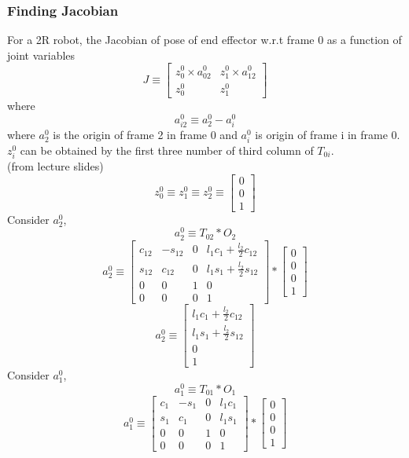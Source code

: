\documentclass[12pt]{article}
\newcommand{\fromlectures}{{\\ \color{blue} \hspace*{\fill}(from lecture slides)} \\}
\begin{document}
\subsubsection*{Finding Jacobian}
For a 2R robot, the Jacobian of pose of end effector w.r.t frame 0 as a function of joint variables
\[
  J \equiv
  \begin{bmatrix} z_0^0 \times a_{02}^0 & z_1^0 \times a_{12}^0\\ z_0^0 & z_1^0 \end{bmatrix}
\]
where
\[
  a_{i2}^{0} \equiv a_{2}^{0} - a_{i}^{0}
\]
where $a_2^0$ is the origin of frame 2 in frame 0 and $a_i^0$ is origin of frame i in frame 0.
$z_i^0$ can be obtained by the first three number of third column of $T_{0i}$.
\fromlectures
\[
  z_0^{0} \equiv z_1^{0} \equiv z_2^{0} \equiv \begin{bmatrix} 0 \\ 0 \\ 1 \end{bmatrix}
\]
Consider $a_{2}^{0}$,
\[
  a_2^0 \equiv T_{02} * O_2
\]
\[
  a_2^0 \equiv
  \begin{bmatrix}
    c_{12} & -s_{12} & 0 & l_1c_1 + \frac{l_2}{2}c_{12}\\
    s_{12} & c_{12} & 0 & l_1s_1 + \frac{l_2}{2}s_{12} \\
    0 & 0 & 1 & 0 \\
    0 & 0 & 0 & 1
  \end{bmatrix}
  *
  \begin{bmatrix} 0 \\ 0 \\ 0 \\ 1 \end{bmatrix}
\]
\[
  a_2^0 \equiv
  \begin{bmatrix}
    l_1c_1 + \frac{l_2}{2}c_{12}\\
    l_1s_1 + \frac{l_2}{2}s_{12} \\
    0 \\
    1
  \end{bmatrix}
\]
Consider $a_{1}^{0}$,
\[
  a_1^0 \equiv T_{01} * O_1
\]
\[
  a_1^0 \equiv
  \begin{bmatrix} c_1 & -s_1 & 0 & l_1c_1 \\ s_1 & c_1 & 0 & l_1s_1 \\ 0 & 0 & 1 & 0 \\ 0 & 0 & 0 & 1 \end{bmatrix}
  *
  \begin{bmatrix} 0 \\ 0 \\ 0 \\ 1 \end{bmatrix}
\]
\end{document}

